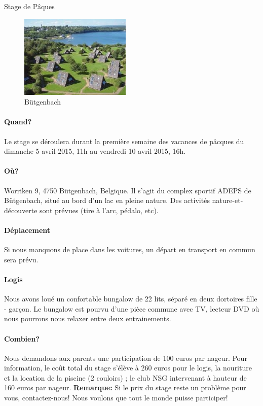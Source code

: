 \documentclass{article}
\begin{document}

\begin{center}\huge{Stage de Pâques}\end{center}

\vspace{1cm}

\begin{figure}
\includegraphics{but.jpg}
\caption*{Bütgenbach}
\vspace{-1.8cm}
\end{figure}

\paragraph{Quand?} Le stage se déroulera durant la première semaine des vacances de pâcques du dimanche 5 avril 2015, 11h au vendredi 10 avril 2015, 16h.

\paragraph{Où?} Worriken 9, 4750 Bütgenbach, Belgique. Il s'agit du complex sportif ADEPS de Bütgenbach, situé au bord d'un lac en pleine nature. Des activités nature-et-découverte sont prévues (tire à l'arc, pédalo, etc).

\paragraph{Déplacement} Si nous manquons de place dans les voitures, un départ en transport en commun sera prévu.

\paragraph{Logis} Nous avons loué un confortable bungalow de 22 lits, séparé en deux dortoires fille - garçon. Le bungalow est pourvu d'une pièce commune avec TV, lecteur DVD où nous pourrons nous relaxer entre deux entrainements.

\paragraph{Combien?} Nous demandons aux parents une participation de 100 euros par nageur. Pour information, le coût total du stage s'élève à 260 euros pour le logis, la nouriture et la location de la piscine (2 couloirs) ; le club NSG intervenant à hauteur de 160 euros par nageur. {\bf Remarque:} Si le prix du stage reste un problème pour vous, contactez-nous! Nous voulons que tout le monde puisse participer!
\end{document}
